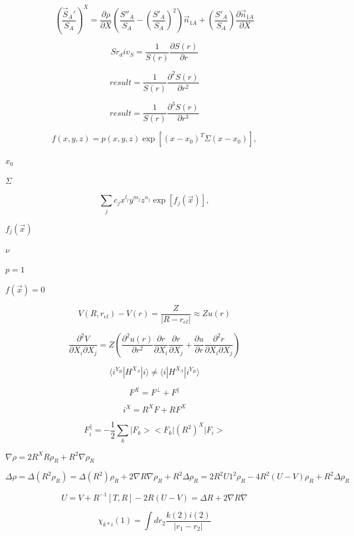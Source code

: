 \documentclass{article}
\begin{document}
\[
\left(\frac{\vec S_A'}{S_A}\right)^X =
    \frac{\partial \rho}{\partial X}\left(\frac{S''_A}{S_A}
         -\left(\frac{S'_A}{S_A}\right)^2\right)\vec n_{1A}
    + \left(\frac{S'_A}{S_A}\right)\frac{\partial \vec n_{1A}}{\partial X}
\]
\pagebreak

\[
    Sr_div_S = \frac{1}{S(r)}\frac{\partial S(r)}{\partial r}
\]
\pagebreak

\[
    result = \frac{1}{S(r)}\frac{\partial^2 S(r)}{\partial r^2}
\]
\pagebreak

\[
   result = \frac{1}{S(r)}\frac{\partial^3 S(r)}{\partial r^3}
\]
\pagebreak

\[
f(x,y,z) = p(x,y,z) \exp[(x-x_0)^T \Sigma (x-x_0)],
\]
\pagebreak

$x_0$
\pagebreak

$\Sigma$
\pagebreak

\[
\sum_j c_j x^{l_j} y^{m_j} z^{n_j} \exp[f_j(\vec{x})],
\]
\pagebreak

$f_j(\vec{x})$
\pagebreak

$\nu$
\pagebreak

$p=1$
\pagebreak

$f(\vec{x})=0$
\pagebreak

\[
V(R,r_{el}) -V(r) =\frac{Z}{|R-r_{el}|} \approx Z u(r) \]
\pagebreak

\[
\frac{\partial^2 V}{\partial X_i\partial X_j}
  =  Z \left(\frac{\partial^2 u(r)}{\partial r^2} \frac{\partial r}{\partial X_i}
     \frac{\partial r}{\partial X_j} + \frac{\partial u}{\partial r}
     \frac{\partial^2 r}{\partial X_i \partial X_j}\right)
\]
\pagebreak

\[
 \langle i^{Y_B}|H^{X_A}|i\rangle \neq \langle i|H^{X_A}|i^{Y_B}\rangle
\]
\pagebreak

\[
    F^X = F^\perp + F^\parallel
\]
\pagebreak

\[
  i^X   = R^X F + R F^X
\]
\pagebreak

\[
 F_i^\parallel = -\frac{1}{2}\sum_k|F_k ><F_k | (R^2)^X | F_i>
\]
\pagebreak

$ \nabla\rho = 2R^X R \rho_R + R^2\nabla \rho_R $
\pagebreak

\[
  \Delta \rho = \Delta (R^2 \rho_R)
         = \Delta (R^2) \rho_R + 2\nabla R \nabla \rho_R + R^2 \Delta \rho_R
         = 2 R^2 U1^2 \rho_R -4 R^2 ( U-V ) \rho_R + R^2 \Delta\rho_R
\]
\pagebreak

\[
  U=V + R^{-1}[T,R]
  -2 R (U-V) = \Delta R + 2\nabla R\dot \nabla
\]
\pagebreak

\[ \chi_{k{*} i}(1) = \int dr_2 \frac{k(2) i(2)}{|r_1-r_2|} \]
\pagebreak
\end{document}

